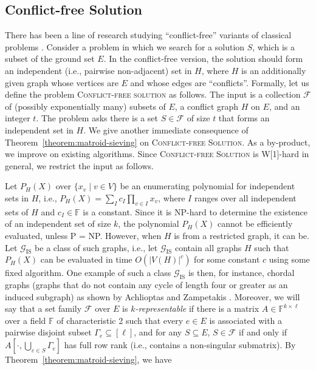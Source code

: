 \documentclass[10pt,a4paper]{article}
\newcommand{\F}{\ensuremath{\mathbb F}\xspace}
\newcommand{\cF}{\ensuremath{\mathcal F}\xspace}
\begin{document}
\subsection{Conflict-free Solution}
\label{sec:conflict}

There has been a line of research studying ``conflict-free'' variants of classical problems \cite{AgrawalJKS20,DarmannPS09,DarmannPSW11,JacobMR21}.
Consider a problem in which we search for a solution $S$, which is a subset of the ground set $E$.
In the conflict-free version, the solution should form an independent (i.e., pairwise non-adjacent) set in $H$, where $H$ is an additionally given graph whose vertices are $E$ and whose edges are ``conflicts''.
Formally, let us define the problem \textsc{Conflict-free solution} as follows.
The input is a collection $\mathcal{F}$ of (possibly exponentially many) subsets of $E$, a conflict graph $H$ on $E$, and an integer $t$.
The problem asks there is a set $S \in \cF$ of size $t$ that forms an independent set in $H$.
We give another immediate consequence of Theorem~\ref{theorem:matroid-sieving} on \textsc{Conflict-free Solution}.
As a by-product, we improve on existing algorithms.
Since \textsc{Conflict-free Solution} is W[1]-hard in general, we restrict the input as follows.

\newcommand{\IS}{\text{IS}}

Let $P_H(X)$ over $\{ x_v \mid v \in V \}$ be an enumerating polynomial for independent sets in $H$, i.e., $P_H(X) = \sum_{I} c_I \prod_{v \in I} x_v$, where $I$ ranges over all independent sets of $H$ and $c_I \in \F$ is a constant.
Since it is NP-hard to determine the existence of an independent set of size $k$, the polynomial $P_H(X)$ cannot be efficiently evaluated, unless P = NP.
However, when $H$ is from a restricted graph, it can be.
Let $\mathcal{G}_{\IS}$ be a class of such graphs, i.e., let $\mathcal{G}_{\IS}$ contain all graphs $H$ such that $P_H(X)$ can be evaluated in
time $O(|V(H)|^c)$ for some constant $c$ using some fixed algorithm. 
One example of such a class $\mathcal{G}_{\IS}$ is then, for instance, chordal graphs (graphs that do not contain any cycle of length four or greater as an induced subgraph) as shown by Achlioptas and Zampetakis \cite{AchlioptasZ21}.
Moreover, we will say that a set family $\cF$ over $E$ is \emph{$k$-representable} if there is a matrix $A \in \F^{k \times \ell}$ over a field $\F$ of characteristic 2
such that every $e \in E$ is associated with a pairwise disjoint subset $\Gamma_e \subseteq [\ell]$, and for any $S \subseteq E$, $S \in \cF$ if and only if $A[\cdot, \bigcup_{e \in S} \Gamma_e]$ has full row rank (i.e., contains a non-singular submatrix).
By Theorem~\ref{theorem:matroid-sieving}, we have
\end{document}
